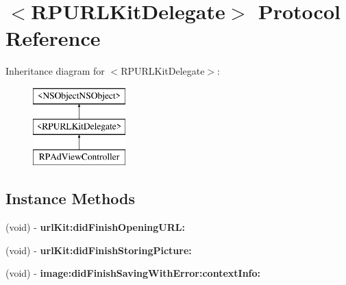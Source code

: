 \hypertarget{protocol_r_p_u_r_l_kit_delegate-p}{\section{$<$R\-P\-U\-R\-L\-Kit\-Delegate$>$ Protocol Reference}
\label{protocol_r_p_u_r_l_kit_delegate-p}
}
Inheritance diagram for $<$R\-P\-U\-R\-L\-Kit\-Delegate$>$\-:\begin{figure}[H]
\begin{center}
\leavevmode
\includegraphics[height=3.000000cm]{protocol_r_p_u_r_l_kit_delegate-p}
\end{center}
\end{figure}
\subsection*{Instance Methods}
\begin{DoxyCompactItemize}
\item 
\hypertarget{protocol_r_p_u_r_l_kit_delegate-p_a75a60adfc085095f29b0ad7dd3af0e4c}{(void) -\/ {\bfseries url\-Kit\-:did\-Finish\-Opening\-U\-R\-L\-:}}\label{protocol_r_p_u_r_l_kit_delegate-p_a75a60adfc085095f29b0ad7dd3af0e4c}

\item 
\hypertarget{protocol_r_p_u_r_l_kit_delegate-p_a770e893d5bd9b0e324f8ebe92eb60abc}{(void) -\/ {\bfseries url\-Kit\-:did\-Finish\-Storing\-Picture\-:}}\label{protocol_r_p_u_r_l_kit_delegate-p_a770e893d5bd9b0e324f8ebe92eb60abc}

\item 
\hypertarget{protocol_r_p_u_r_l_kit_delegate-p_aee5c12576b54930a18def313deba54e7}{(void) -\/ {\bfseries image\-:did\-Finish\-Saving\-With\-Error\-:context\-Info\-:}}\label{protocol_r_p_u_r_l_kit_delegate-p_aee5c12576b54930a18def313deba54e7}

\end{DoxyCompactItemize}
